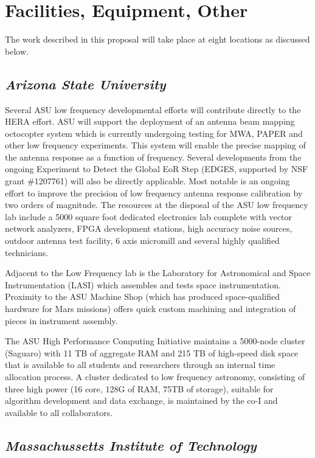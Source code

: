 \documentclass[11pt]{article}
\begin{document}
\pagestyle{empty}

\section*{Facilities, Equipment, Other}

The work described in this proposal will take place at eight locations as discussed below. 

\subsection*{\it Arizona State University}

Several ASU low frequency developmental efforts will contribute directly to the
HERA effort. ASU will support the deployment of an antenna beam mapping
octocopter system which is currently undergoing testing for MWA, PAPER and
other low frequency experiments. This system will enable the precise mapping of
the antenna response as a function of frequency. Several developments from the
ongoing Experiment to Detect the Global EoR Step (EDGES, supported by NSF grant
\#1207761) will also be directly applicable.  Most notable is an ongoing effort
to improve the precision of low frequency antenna response calibration by two
orders of magnitude. The resources at the disposal of the ASU low frequency lab
include a 5000 square foot dedicated electronics lab complete with vector
network analyzers, FPGA development stations, high accuracy noise sources,
outdoor antenna test facility, 6 axis micromill and several highly qualified
technicians.

Adjacent to the Low Frequency lab is the Laboratory for Astronomical and Space
Instrumentation (LASI) which assembles and tests space instrumentation.
Proximity to the ASU Machine Shop (which has produced space-qualified hardware
for Mars missions) offers quick custom machining and integration of pieces in
instrument assembly. 

The ASU High Performance Computing Initiative maintains a 5000-node cluster
(Saguaro) with 11 TB of aggregate RAM and 215 TB of high-speed disk space that
is available to all students and researchers through an internal time
allocation process. A cluster dedicated to low frequency astronomy, consisting
of three high power (16 core, 128G of RAM, 75TB of storage), suitable for
algorithm development and data exchange, is maintained by the co-I and
available to all collaborators.

\subsection*{\it Massachussetts Institute of Technology}
\end{document}
